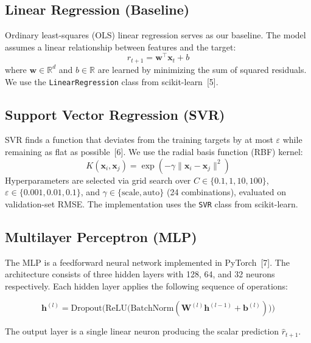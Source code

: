 \documentclass{article}
\begin{document}
\subsection{Linear Regression (Baseline)}

Ordinary least-squares (OLS) linear regression serves as our baseline. The model assumes a linear relationship between features and the target:
\begin{equation}
  \hat{r}_{t+1} = \mathbf{w}^\top \mathbf{x}_t + b
\end{equation}
where $\mathbf{w} \in \mathbb{R}^d$ and $b \in \mathbb{R}$ are learned by minimizing the sum of squared residuals. We use the \texttt{LinearRegression} class from scikit-learn~[5].

\subsection{Support Vector Regression (SVR)}

SVR finds a function that deviates from the training targets by at most $\varepsilon$ while remaining as flat as possible~[6]. We use the radial basis function (RBF) kernel:
\begin{equation}
  K(\mathbf{x}_i, \mathbf{x}_j) = \exp\!\left(-\gamma \|\mathbf{x}_i - \mathbf{x}_j\|^2\right)
\end{equation}
Hyperparameters are selected via grid search over $C \in \{0.1, 1, 10, 100\}$, $\varepsilon \in \{0.001, 0.01, 0.1\}$, and $\gamma \in \{\text{scale}, \text{auto}\}$ (24 combinations), evaluated on validation-set RMSE. The implementation uses the \texttt{SVR} class from scikit-learn.

\subsection{Multilayer Perceptron (MLP)}

The MLP is a feedforward neural network implemented in PyTorch~[7]. The architecture consists of three hidden layers with 128, 64, and 32 neurons respectively. Each hidden layer applies the following sequence of operations:

\begin{equation}
  \mathbf{h}^{(l)} = \text{Dropout}\!\Big(\text{ReLU}\!\big(\text{BatchNorm}(\mathbf{W}^{(l)} \mathbf{h}^{(l-1)} + \mathbf{b}^{(l)})\big)\Big)
\end{equation}

The output layer is a single linear neuron producing the scalar prediction $\hat{r}_{t+1}$.
\end{document}

